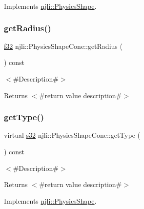 Implements \mbox{\hyperlink{classnjli_1_1_physics_shape_ad5418af48c1210d6d5119244826cacbb}{njli\+::\+Physics\+Shape}}.

\mbox{\label{classnjli_1_1_physics_shape_cone_af5f9bdb09664649e9d7398624f5db6df}} 
\subsubsection{\texorpdfstring{get\+Radius()}{getRadius()}}
{\footnotesize\ttfamily \mbox{\hyperlink{_util_8h_a5f6906312a689f27d70e9d086649d3fd}{f32}} njli\+::\+Physics\+Shape\+Cone\+::get\+Radius (\begin{DoxyParamCaption}{ }\end{DoxyParamCaption}) const}

$<$\#\+Description\#$>$

\begin{DoxyReturn}{Returns}
$<$\#return value description\#$>$ 
\end{DoxyReturn}
\mbox{\label{classnjli_1_1_physics_shape_cone_ae5cf0a39440a5d46dbb8cae82a73c794}} 
\subsubsection{\texorpdfstring{get\+Type()}{getType()}}
{\footnotesize\ttfamily virtual \mbox{\hyperlink{_util_8h_aa62c75d314a0d1f37f79c4b73b2292e2}{s32}} njli\+::\+Physics\+Shape\+Cone\+::get\+Type (\begin{DoxyParamCaption}{ }\end{DoxyParamCaption}) const\hspace{0.3cm}{\ttfamily [virtual]}}

$<$\#\+Description\#$>$

\begin{DoxyReturn}{Returns}
$<$\#return value description\#$>$ 
\end{DoxyReturn}


Implements \mbox{\hyperlink{classnjli_1_1_physics_shape_ac7c6b2ac373892095f8220d56f8ad6de}{njli\+::\+Physics\+Shape}}.

